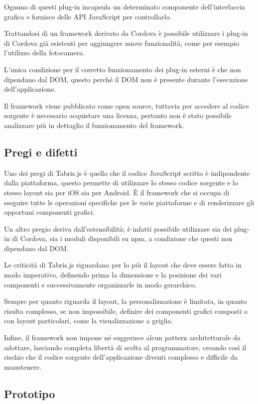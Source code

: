 Ognuno di questi plug-in incapsula un determinato componente dell'interfaccia grafica e fornisce delle API JavaScript per controllarlo.

Trattandosi di un framework derivato da Cordova è possibile utilizzare i plug-in di Cordova già esistenti per aggiungere nuove funzionalità, come per esempio l'utilizzo della fotocamera. 

L'unica condizione per il corretto funzionamento dei plug-in esterni è che non dipendano dal DOM, questo perché il DOM non è presente durante l'esecuzione dell'applicazione.

Il framework viene pubblicato come open source, tuttavia per accedere al codice sorgente è necessario acquistare una licenza, pertanto non è stato possibile analizzare più in dettaglio il funzionamento del framework.

\subsection{Pregi e difetti}

Uno dei pregi di Tabris.js è quello che il codice JavaScript scritto è indipendente dalla piattaforma, questo permette di utilizzare lo stesso codice sorgente e lo stesso layout sia per iOS sia per Android.
\`E il framework che si occupa di eseguire tutte le operazioni specifiche per le varie piattaforme e di renderizzare gli opportuni componenti grafici.

Un altro pregio deriva dall'estensibilità; è infatti possibile utilizzare sia dei plug-in di Cordova, sia i moduli disponibili su \gls{npm}, a condizione che questi non dipendano dal DOM.

Le criticità di Tabris.js riguardano per lo più il layout che deve essere fatto in modo imperativo, definendo prima la dimensione e la posizione dei vari componenti e successivamente organizzarle in modo gerarchico.

Sempre per quanto riguarda il layout, la personalizzazione è limitata, in quanto risulta complesso, se non impossibile, definire dei componenti grafici composti o con layout particolari, come la visualizzazione a griglia.

Infine, il framework non impone né suggerisce alcun pattern architetturale da adottare, lasciando completa libertà di scelta al programmatore, creando così il rischio che il codice sorgente dell'applicazione diventi complesso e difficile da manutenere.

\subsection{Prototipo}

